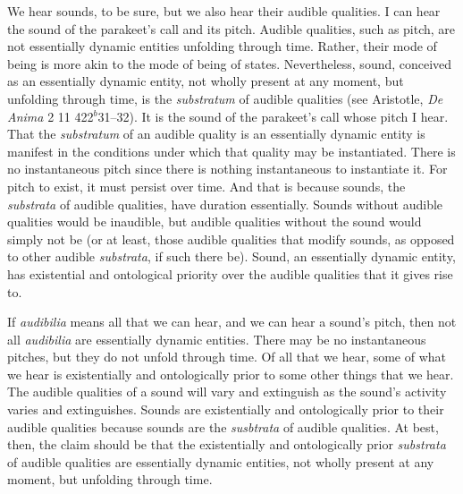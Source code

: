 We hear sounds, to be sure, but we also hear their audible qualities. I can hear the sound of the parakeet's call and its pitch. Audible qualities, such as pitch, are not essentially dynamic entities unfolding through time. Rather, their mode of being is more akin to the mode of being of states. Nevertheless, sound, conceived as an essentially dynamic entity, not wholly present at any moment, but unfolding through time, is the \emph{substratum} of audible qualities (see Aristotle, \emph{De Anima} 2 11 422\( ^{b} \)31–32). It is the sound of the parakeet's call whose pitch I hear. That the \emph{substratum} of an audible quality is an essentially dynamic entity is manifest in the conditions under which that quality may be instantiated. There is no instantaneous pitch since there is nothing instantaneous to instantiate it. For pitch to exist, it must persist over time. And that is because sounds, the \emph{substrata} of audible qualities, have duration essentially. Sounds without audible qualities would be inaudible, but audible qualities without the sound would simply not be (or at least, those audible qualities that modify sounds, as opposed to other audible \emph{substrata}, if such there be). Sound, an essentially dynamic entity, has existential and ontological priority over the audible qualities that it gives rise to. 

If \emph{audibilia} means all that we can hear, and we can hear a sound's pitch, then not all \emph{audibilia} are essentially dynamic entities. There may be no instantaneous pitches, but they do not unfold through time. Of all that we hear, some of what we hear is existentially and ontologically prior to some other things that we hear. The audible qualities of a sound will vary and extinguish as the sound's activity varies and extinguishes. Sounds are existentially and ontologically prior to their audible qualities because sounds are the \emph{susbtrata} of audible qualities. At best, then, the claim should be that the existentially and ontologically prior \emph{substrata} of audible qualities are essentially dynamic entities, not wholly present at any moment, but unfolding through time.


